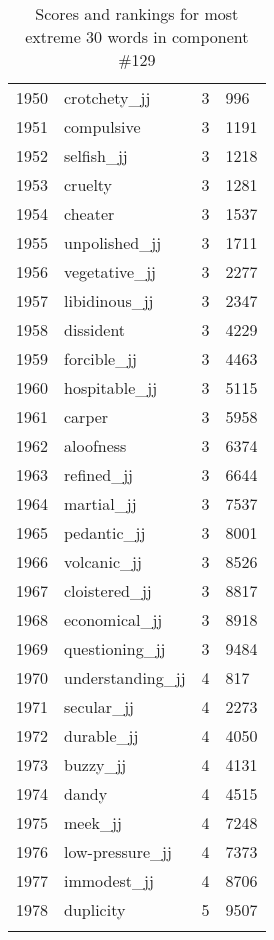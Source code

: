 \begin{longtable}[!htbp]{| rlr@{.}l |}
    1950 & crotchety\_jj & 3 & 996 \\
    1951 & compulsive & 3 & 1191 \\
    1952 & selfish\_jj & 3 & 1218 \\
    1953 & cruelty & 3 & 1281 \\
    1954 & cheater & 3 & 1537 \\
    1955 & unpolished\_jj & 3 & 1711 \\
    1956 & vegetative\_jj & 3 & 2277 \\
    1957 & libidinous\_jj & 3 & 2347 \\
    1958 & dissident & 3 & 4229 \\
    1959 & forcible\_jj & 3 & 4463 \\
    1960 & hospitable\_jj & 3 & 5115 \\
    1961 & carper & 3 & 5958 \\
    1962 & aloofness & 3 & 6374 \\
    1963 & refined\_jj & 3 & 6644 \\
    1964 & martial\_jj & 3 & 7537 \\
    1965 & pedantic\_jj & 3 & 8001 \\
    1966 & volcanic\_jj & 3 & 8526 \\
    1967 & cloistered\_jj & 3 & 8817 \\
    1968 & economical\_jj & 3 & 8918 \\
    1969 & questioning\_jj & 3 & 9484 \\
    1970 & understanding\_jj & 4 & 817 \\
    1971 & secular\_jj & 4 & 2273 \\
    1972 & durable\_jj & 4 & 4050 \\
    1973 & buzzy\_jj & 4 & 4131 \\
    1974 & dandy & 4 & 4515 \\
    1975 & meek\_jj & 4 & 7248 \\
    1976 & low-pressure\_jj & 4 & 7373 \\
    1977 & immodest\_jj & 4 & 8706 \\
    1978 & duplicity & 5 & 9507 \\
    \hline
    \caption{Scores and rankings for most extreme 30 words in component \#129} \\
\end{longtable}
